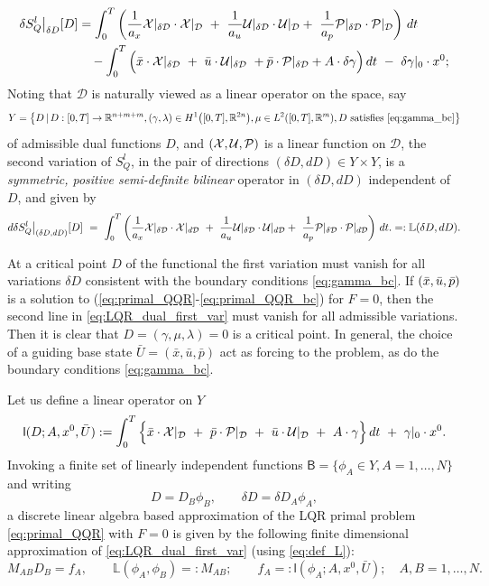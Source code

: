 \documentclass[11pt]{article}
\newcommand{\R}{\mathbb R}
\newcommand{\calP}{{\cal P}}
\newcommand{\calU}{{\cal U}}
\newcommand{\calX}{{\cal X}}
\newcommand{\dee}{\mathcal{D}}
\begin{document}
\begin{equation}
    \label{eq:LQR_dual_first_var}
    \begin{aligned}
        \delta S^l_Q\big|_{\delta D} [D] & = \int_0^T  \left( \frac{1}{a_x}  \calX|_{\delta \dee} \cdot \calX|_\dee \ + \ \frac{1}{a_u} \calU|_{\delta \dee} \cdot \calU|_\dee
    + \ \frac{1}{a_p} \calP|_{\delta \dee} \cdot \calP|_\dee \right) \, dt \\
    &  \quad - \int_0^T \Big( \bar{x} \cdot \calX|_{\delta \dee} \ + \ \bar{u} \cdot \calU|_{\delta \dee} \ + \bar{p} \cdot \calP|_{\delta \dee} + A \cdot \delta \gamma \Big) \, dt \  - \ \delta \gamma|_0 \cdot x^0;
    \end{aligned}
\end{equation}
 Noting that $\dee$ is naturally viewed as a linear operator on the space, say 
 \[
 Y = \big\{ D \, | \, D:[0,T] \to \R^{n+m+m}, (\gamma, \lambda) \in H^1 \big([0,T],\R^{2n}\big), \mu \in L^{2}([0,T],\R^m) , D \mbox{ satisfies } \eqref{eq:gamma_bc} \big\}
 \]
 of admissible dual functions $D$,  and $(\calX, \calU, \calP)$ is a linear function on $\dee$, the second variation of $S^l_Q$, in the pair of directions $(\delta D, d D) \in Y \times Y$, is a \emph{symmetric, positive semi-definite bilinear} operator in $(\delta D, d D)$ independent of $D$,  and given by
 \begin{equation}\label{eq:def_L}
     d \delta S^l_Q\big|_{(\delta D, dD)} [D] \ = \ \int_0^T  \left( \frac{1}{a_x}  \calX|_{\delta \dee} \cdot \calX|_{d \dee} \ + \ \frac{1}{a_u} \calU|_{\delta \dee} \cdot \calU|_{d \dee}
    + \ \frac{1}{a_p} \calP|_{\delta \dee} \cdot \calP|_{d \dee} \right) \, dt. =: \mathbb{L} (\delta D, d D).
 \end{equation}
 
At a critical point $D$ of the functional the first variation must vanish for all variations $\delta D$ consistent with the boundary conditions \eqref{eq:gamma_bc}. If $(\bar{x},\Bar{u},\bar{p})$ is a solution to (\ref{eq:primal_QQR}-\ref{eq:primal_QQR_bc}) for $F = 0$, then the second line in \eqref{eq:LQR_dual_first_var} must vanish for all admissible variations. Then it is clear that $D = (\gamma, \mu, \lambda) = 0$ is a critical point. In general, the choice of a guiding base state $\bar{U} = (\bar{x}, \bar{u}, \bar{p})$ act as forcing to the problem, as do the boundary conditions \eqref{eq:gamma_bc}.

Let us define a linear operator on $Y$
\[
\mathsf{l}(D;A,x^0,\bar{U}) := \int_0^T \Big\{ \bar{x} \cdot \calX |_\dee  \ + \ \bar{p} \cdot \calP |_\dee  \ + \ \bar{u} \cdot \calU |_\dee \ + \ A \cdot \gamma \Big\} \, dt \ + \  \gamma|_0 \cdot x^0.
\]
Invoking a finite set of linearly independent functions $\mathsf{B} = \{ \phi_A \in Y, A = 1, \ldots, N \}$ and writing 
\[
D = D_B \phi_B, \qquad \delta D = \delta D_A \phi_A,
\]
a discrete linear algebra based approximation of the  LQR primal problem \eqref{eq:primal_QQR} with $F = 0$ is given by the following finite dimensional approximation of \eqref{eq:LQR_dual_first_var} (using \eqref{eq:def_L}):
\[
M_{AB} D_B = f_A, \qquad \mathbb{L}(\phi_A, \phi_B) =: M_{AB}; \qquad f_A =: \mathsf{l}(\phi_A; A,x^0, \bar{U}); \quad A, B = 1, \ldots, N.
\]
\end{document}
